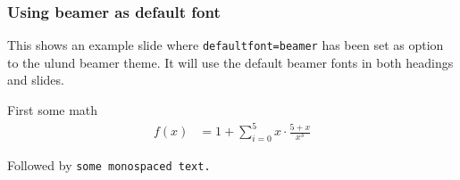 \documentclass[aspectratio=1610]{beamer}
\begin{document}
\begin{frame}
  \frametitle{Using beamer as default font}
  This shows an example slide where \texttt{defaultfont=beamer} has been set as option to the ulund beamer theme. It will use the default beamer fonts in both headings and slides.

  \medskip
  First some math
  \begin{align}
    f(x) &= 1 + \sum_{i=0}^{5} x \cdot \frac{5+x}{x^3}
  \end{align}

  \medskip
  Followed by \texttt{some monospaced text.}
\end{frame}

\end{document}
